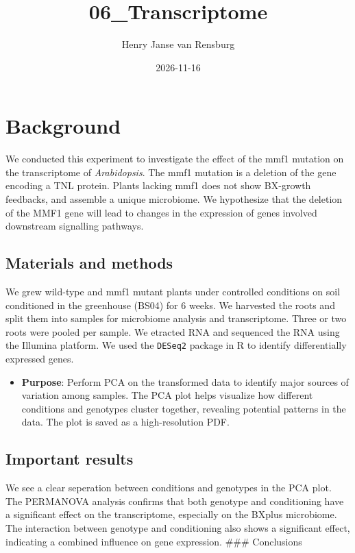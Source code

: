 \documentclass[
  11pt,
]{article}
\title{06\_Transcriptome}
\author{Henry Janse van Rensburg}
\date{2026-11-16}
\providecommand{\tightlist}{%
  \setlength{\itemsep}{0pt}\setlength{\parskip}{0pt}}\usepackage{longtable,booktabs,array}
\renewcommand*\contentsname{Table of contents}
\newcommand\contentsname{Table of contents}
\begin{document}
\maketitle

\renewcommand*\contentsname{Table of contents}
{
\hypersetup{linkcolor=}
\setcounter{tocdepth}{2}
\tableofcontents
}

\section{Background}\label{background}

We conducted this experiment to investigate the effect of the mmf1
mutation on the transcriptome of \emph{Arabidopsis}. The mmf1 mutation
is a deletion of the gene encoding a TNL protein. Plants lacking mmf1
does not show BX-growth feedbacks, and assemble a unique microbiome. We
hypothesize that the deletion of the MMF1 gene will lead to changes in
the expression of genes involved downstream signalling pathways.

\subsection{Materials and methods}\label{materials-and-methods}

We grew wild-type and mmf1 mutant plants under controlled conditions on
soil conditioned in the greenhouse (BS04) for 6 weeks. We harvested the
roots and split them into samples for microbiome analysis and
transcriptome. Three or two roots were pooled per sample. We etracted
RNA and sequenced the RNA using the Illumina platform. We used the
\texttt{DESeq2} package in R to identify differentially expressed genes.

\begin{itemize}
\tightlist
\item
  \textbf{Purpose}: Perform PCA on the transformed data to identify
  major sources of variation among samples. The PCA plot helps visualize
  how different conditions and genotypes cluster together, revealing
  potential patterns in the data. The plot is saved as a high-resolution
  PDF.
\end{itemize}

\subsection{Important results}\label{important-results}

We see a clear seperation between conditions and genotypes in the PCA
plot. The PERMANOVA analysis confirms that both genotype and
conditioning have a significant effect on the transcriptome, especially
on the BXplus microbiome. The interaction between genotype and
conditioning also shows a significant effect, indicating a combined
influence on gene expression. \#\#\# Conclusions
\end{document}
